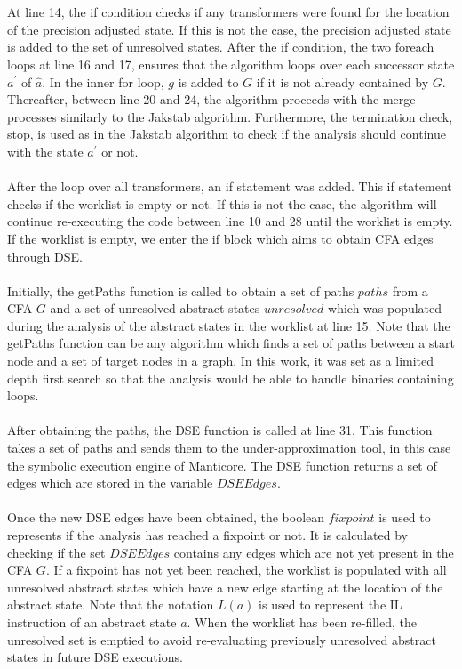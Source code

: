 \documentclass{kththesis}
\begin{document}
\\ \\
At line 14, the if condition checks if any transformers were found for the location of the precision adjusted state. If this is not the case, the precision adjusted state is added to the set of unresolved states. After the if condition, the two foreach loops at line 16 and 17, ensures that the algorithm loops over each successor state $a^{\prime}$ of $\hat{a}$. In the inner for loop, $g$ is added to $G$ if it is not already contained by $G$. Thereafter, between line 20 and 24, the algorithm proceeds with the merge processes similarly to the Jakstab algorithm. Furthermore, the termination check, stop, is used as in the Jakstab algorithm to check if the analysis should continue with the state $a^{\prime}$ or not.
\\ \\
After the loop over all transformers, an if statement was added. This if statement checks if the worklist is empty or not. If this is not the case, the algorithm will continue re-executing the code between line 10 and 28 until the worklist is empty. If the worklist is empty, we enter the if block which aims to obtain CFA edges through DSE.
\\ \\
Initially, the getPaths function is called to obtain a set of paths $paths$ from a CFA $G$ and a set of unresolved abstract states $unresolved$ which was populated during the analysis of the abstract states in the worklist at line 15. Note that the getPaths function can be any algorithm which finds a set of paths between a start node and a set of target nodes in a graph. In this work, it was set as a limited depth first search so that the analysis would be able to handle binaries containing loops.
\\ \\
After obtaining the paths, the DSE function is called at line 31. This function takes a set of paths and sends them to the under-approximation tool, in this case the symbolic execution engine of Manticore. The DSE function returns a set of edges which are stored in the variable $DSEEdges$. 
\\ \\
Once the new DSE edges have been obtained, the boolean $fixpoint$ is used to represents if the analysis has reached a fixpoint or not. It is calculated by checking if the set $DSEEdges$ contains any edges which are not yet present in the CFA $G$. If a fixpoint has not yet been reached, the worklist is populated with all unresolved abstract states which have a new edge starting at the location of the abstract state. Note that the notation $L(a)$ is used to represent the IL instruction of an abstract state $a$. When the worklist has been re-filled, the unresolved set is emptied to avoid re-evaluating previously unresolved abstract states in future DSE executions. 
\end{document}
